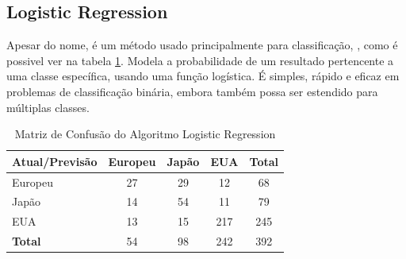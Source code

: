 \documentclass[conference]{IEEEtran}
\begin{document}
\subsection{Logistic Regression}
Apesar do nome, é um método usado principalmente para classificação, , como é possivel ver na tabela \ref{tab:conf_matrix_logistic}.
Modela a probabilidade de um resultado pertencente a uma classe específica, usando uma função logística. É simples, rápido e eficaz
em problemas de classificação binária, embora também possa ser estendido para múltiplas classes.
\begin{table}[!ht]
	\centering
	\begin{tabular}{lcccc}
		\toprule
		\textbf{Atual/Previsão} & \textbf{Europeu} & \textbf{Japão} & \textbf{EUA} & \textbf{Total} \\
		\midrule
		Europeu                 & 27               & 29             & 12           & 68             \\
		Japão                   & 14               & 54             & 11           & 79             \\
		EUA                     & 13               & 15             & 217          & 245            \\
		\midrule
		\textbf{Total}          & 54               & 98             & 242          & 392            \\
		\bottomrule
	\end{tabular}
	\caption{Matriz de Confusão do Algoritmo Logistic Regression}
	\label{tab:conf_matrix_logistic}

\end{table}

\end{document}
